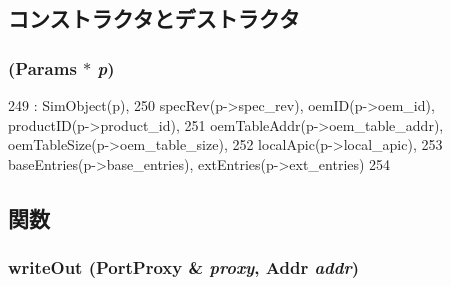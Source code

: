 \subsection{コンストラクタとデストラクタ}
\hypertarget{classX86ISA_1_1IntelMP_1_1ConfigTable_ae6957ab4975a9b0764b115d22df8797e}{
\subsubsection[{ConfigTable}]{ ({\bf Params} $\ast$ {\em p})}}
\label{classX86ISA_1_1IntelMP_1_1ConfigTable_ae6957ab4975a9b0764b115d22df8797e}



\begin{DoxyCode}
249                                                 : SimObject(p),
250     specRev(p->spec_rev), oemID(p->oem_id), productID(p->product_id),
251     oemTableAddr(p->oem_table_addr), oemTableSize(p->oem_table_size),
252     localApic(p->local_apic),
253     baseEntries(p->base_entries), extEntries(p->ext_entries)
254 {}
\end{DoxyCode}


\subsection{関数}
\hypertarget{classX86ISA_1_1IntelMP_1_1ConfigTable_ad41fd44625bfa1495c2d729037dbf863}{
\subsubsection[{writeOut}]{ writeOut ({\bf PortProxy} \& {\em proxy}, \/  {\bf Addr} {\em addr})}}
\label{classX86ISA_1_1IntelMP_1_1ConfigTable_ad41fd44625bfa1495c2d729037dbf863}



